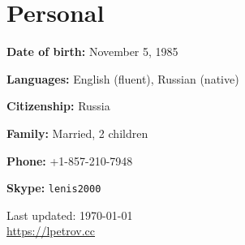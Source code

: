\documentclass[letterpaper,11pt]{article}
\def\footerlink{https://lpetrov.cc}
\begin{document}
\section*{Personal}

\textbf{Date of birth:} November 5, 1985

\textbf{Languages:} English (fluent), Russian (native)

\textbf{Citizenship:} Russia

\textbf{Family:} Married, 2 children

\textbf{Phone:} +1-857-210-7948

\textbf{Skype:} \texttt{lenis2000}

\bigskip

\begin{center}
	\begin{footnotesize}
		Last updated: \today \\ \href{\footerlink}{\url{\footerlink}}
	\end{footnotesize}
\end{center}
\end{document}
